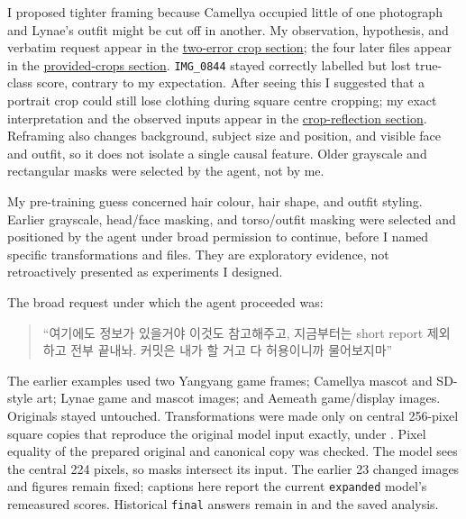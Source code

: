 \documentclass[11pt]{article}
\begin{document}
I proposed tighter framing because Camellya occupied little of one photograph and Lynae's outfit might be cut off in another. My observation, hypothesis, and verbatim request appear in the \hyperref[p7:student_crop_request]{two-error crop section}; the four later files appear in the \hyperref[p7:student_provided_crops]{provided-crops section}. \texttt{IMG\_0844} stayed correctly labelled but lost true-class score, contrary to my expectation. After seeing this I suggested that a portrait crop could still lose clothing during square centre cropping; my exact interpretation and the observed inputs appear in the \hyperref[p7:student_crop_reflection]{crop-reflection section}. Reframing also changes background, subject size and position, and visible face and outfit, so it does not isolate a single causal feature. Older grayscale and rectangular masks were selected by the agent, not by me.

My pre-training guess concerned hair colour, hair shape, and outfit styling. Earlier grayscale, head/face masking, and torso/outfit masking were selected and positioned by the agent under broad permission to continue, before I named specific transformations and files. They are exploratory evidence, not retroactively presented as experiments I designed.

The broad request under which the agent proceeded was:
\begin{quote}
``여기에도 정보가 있을거야 이것도 참고해주고, 지금부터는 short report 제외하고 전부 끝내놔. 커밋은 내가 할 거고 다 허용이니까 물어보지마''
\end{quote}

The earlier examples used two Yangyang game frames; Camellya mascot and SD-style art; Lynae game and mascot images; and Aemeath game/display images. Originals stayed untouched. Transformations were made only on central 256-pixel square copies that reproduce the original model input exactly, under . Pixel equality of the prepared original and canonical copy was checked. The model sees the central 224 pixels, so masks intersect its input. The earlier 23 changed images and figures remain fixed; captions here report the current \texttt{expanded} model's remeasured scores. Historical \texttt{final} answers remain in  and the saved analysis.

\clearpage
\end{document}
